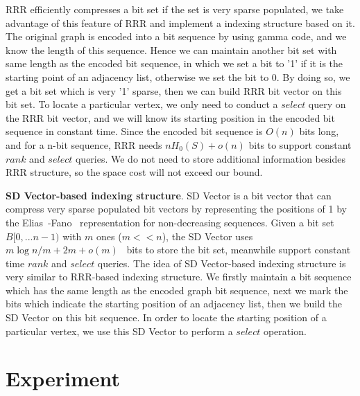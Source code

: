 \documentclass[12pt,glossary]{dalthesis}
\begin{document}
\bigskip
\bigskip

RRR efficiently compresses a bit set if the set is very sparse populated, we take advantage of this feature of RRR and implement a indexing structure based on it. The original graph is encoded into a bit sequence by using gamma code, and we know the length of this sequence. Hence we can maintain another bit set with same length as the encoded bit sequence, in which we set a bit to '1' if it is the starting point of an adjacency list, otherwise we set the bit to 0. By doing so, we get a bit set which is very '1' sparse, then we can build RRR bit vector on this bit set. To locate a particular vertex, we only need to conduct a $select$ query on the RRR bit vector, and we will know its starting position in the encoded bit sequence in constant time. Since the encoded bit sequence is $O(n)$ bits long, and for a n-bit sequence, RRR needs $nH_{0}(S)+o(n)$ bits to support constant $rank$ and $select$ queries. We do not need to store additional information besides RRR structure, so the space cost will not exceed our bound. 

\bigskip
\bigskip

\textbf{SD Vector-based indexing structure}. SD Vector is a bit vector that can compress very sparse populated bit vectors by representing the positions of 1 by the Elias~\cite{Elias}-Fano~\cite{Fano} representation for non-decreasing sequences. Given a bit set $B[0,...n-1)$ with $m$ ones ($m << n$),   the SD Vector uses $m \log n/m  + 2m + o(m)$~\cite{Practical-Entropy} bits to store the bit set, meanwhile support constant time $rank$ and $select$ queries. The idea of SD Vector-based indexing structure is very similar to RRR-based indexing structure. We firstly maintain a bit sequence which has the same length as the encoded graph bit sequence, next we mark the bits which indicate the starting position of an adjacency list, then we build the SD Vector on this bit sequence. In order to locate the starting position of a particular vertex, we use this SD Vector to perform a $select$ operation. 


\chapter{Experiment}
\end{document}
